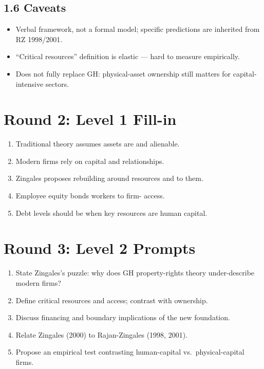\documentclass[11pt]{article}
\newcommand{\blank}[1]{\underline{\hspace{#1}}}
\begin{document}
\subsection*{1.6 Caveats}
\begin{alertbox}
\begin{itemize}
\item Verbal framework, not a formal model; specific predictions are inherited from RZ 1998/2001.
\item ``Critical resources'' definition is elastic --- hard to measure empirically.
\item Does not fully replace GH: physical-asset ownership still matters for capital-intensive sectors.
\end{itemize}
\end{alertbox}

\section*{Round 2: Level 1 Fill-in}
\begin{enumerate}
\item Traditional theory assumes assets are \blank{2cm} and alienable.
\item Modern firms rely on \blank{2cm} capital and relationships.
\item Zingales proposes rebuilding around \blank{2cm} resources and \blank{1.5cm} to them.
\item Employee equity bonds workers to firm-\blank{2cm} access.
\item Debt levels should be \blank{1cm} when key resources are human capital.
\end{enumerate}

\section*{Round 3: Level 2 Prompts}
\begin{enumerate}
\item State Zingales's puzzle: why does GH property-rights theory under-describe modern firms?
\item Define critical resources and access; contrast with ownership.
\item Discuss financing and boundary implications of the new foundation.
\item Relate Zingales (2000) to Rajan-Zingales (1998, 2001).
\item Propose an empirical test contrasting human-capital vs.\ physical-capital firms.
\end{enumerate}
\end{document}
